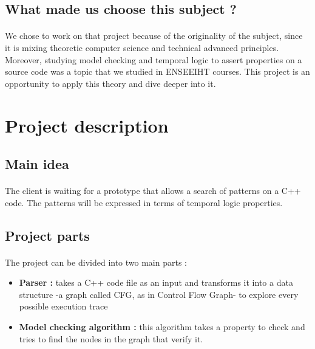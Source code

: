\documentclass{report}
\begin{document}
\subsection{What made us choose this subject ?}

\paragraph{}
\hspace{4mm}We chose to work on that project because of the originality of the subject, since it is mixing theoretic computer science and technical advanced principles.
       Moreover, studying model checking and temporal logic to assert properties on a source code was a topic that we studied in ENSEEIHT courses. This project is an opportunity to apply this theory and dive deeper into it.

\section{Project description}

\subsection{Main idea}

\paragraph{}
\hspace{4mm}The client is waiting for a prototype that allows a search of patterns on a C++ code. The patterns will be expressed in terms of temporal logic properties.

\subsection{Project parts}

\paragraph{}
\hspace{4mm}The project can be divided into two main parts :

\vspace{1.5mm}
\begin{itemize}
\item \textbf{Parser :} takes a C++ code file as an input and transforms it into a data structure -a graph called CFG, as in Control Flow Graph- to explore every possible execution trace\vspace{1mm}
\item \textbf{Model checking algorithm :} this algorithm takes a property to check and tries to find the nodes in the graph that verify it.\vspace{1mm}
\end{itemize}
\end{document}

